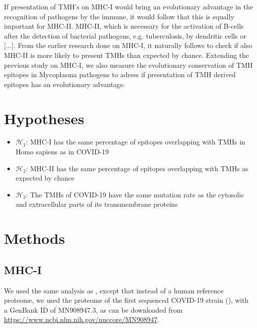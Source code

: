 \documentclass{article}
\begin{document}
If presentation of TMH’s on MHC-I would bring an evolutionary advantage 
in the recognition of pathogens by the immune, 
it would follow that this is equally important for MHC-II. 
MHC-II, which is necessary for the activation of B-cells after the detection 
of bacterial pathogens, e.g.  tuberculosis, by dendritic cells or [...]. 
From the earlier research done on MHC-I, it naturally follows to check if 
also MHC-II is more likely to present TMHs than expected by chance. 
Extending the previous study on MHC-I, we also measure the evolutionary 
conservation of TMH epitopes in Mycoplasma pathogens to adress if 
presentation of TMH derived epitopes has an evolutionary advantage.

\section{Hypotheses}

\begin{itemize}
  \item $\mathcal{H}_1$: MHC-I has the same percentage of epitopes overlapping
    with TMHs in Homo sapiens as in COVID-19
  \item $\mathcal{H}_2$: MHC-II has the same percentage of epitopes overlapping
    with TMHs as expected by chance
  \item $\mathcal{H}_3$: The TMHs of COVID-19 have the same mutation rate 
    as the cytosolic and extracellular parts of its transmembrane proteins
\end{itemize}

\section{Methods}

\subsection{MHC-I}

We used the same analysis as \cite{bianchi2017},
except that instead of a human reference proteome,
we used the proteome of the first sequenced COVID-19 strain (\cite{wu2020new}),
with a GenBank ID of MN908947.3, as can be downloaded 
from \url{https://www.ncbi.nlm.nih.gov/nuccore/MN908947}.
\end{document}
